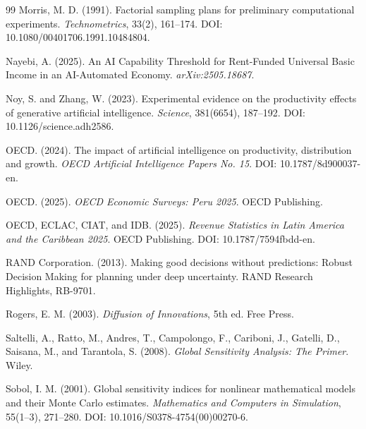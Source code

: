 \documentclass[11pt,a4paper]{article}
\begin{document}
\begin{thebibliography}{99}
Morris, M. D. (1991).
\newblock Factorial sampling plans for preliminary computational experiments.
\newblock \emph{Technometrics}, 33(2), 161--174. DOI: 10.1080/00401706.1991.10484804.

Nayebi, A. (2025).
\newblock An AI Capability Threshold for Rent-Funded Universal Basic Income in an AI-Automated Economy.
\newblock \emph{arXiv:2505.18687}.

Noy, S. and Zhang, W. (2023).
\newblock Experimental evidence on the productivity effects of generative artificial intelligence.
\newblock \emph{Science}, 381(6654), 187--192. DOI: 10.1126/science.adh2586.

OECD. (2024).
\newblock The impact of artificial intelligence on productivity, distribution and growth.
\newblock \emph{OECD Artificial Intelligence Papers No. 15}. DOI: 10.1787/8d900037-en.

OECD. (2025).
\newblock \emph{OECD Economic Surveys: Peru 2025}.
\newblock OECD Publishing.

OECD, ECLAC, CIAT, and IDB. (2025).
\newblock \emph{Revenue Statistics in Latin America and the Caribbean 2025}.
\newblock OECD Publishing. DOI: 10.1787/7594fbdd-en.

RAND Corporation. (2013).
\newblock Making good decisions without predictions: Robust Decision Making for planning under deep uncertainty.
\newblock RAND Research Highlights, RB-9701.


Rogers, E. M. (2003).
\newblock \emph{Diffusion of Innovations}, 5th ed.
\newblock Free Press.



Saltelli, A., Ratto, M., Andres, T., Campolongo, F., Cariboni, J., Gatelli, D., Saisana, M., and Tarantola, S. (2008).
\newblock \emph{Global Sensitivity Analysis: The Primer}.
\newblock Wiley.

Sobol, I. M. (2001).
\newblock Global sensitivity indices for nonlinear mathematical models and their Monte Carlo estimates.
\newblock \emph{Mathematics and Computers in Simulation}, 55(1--3), 271--280. DOI: 10.1016/S0378-4754(00)00270-6.


\end{thebibliography}
\end{document}
